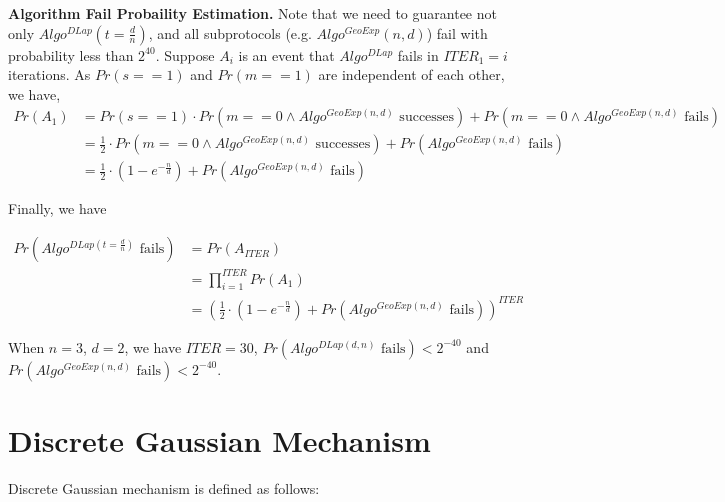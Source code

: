     \textbf{Algorithm Fail Probaility Estimation. }
    Note that we need to guarantee not only $Algo^{DLap}\left(t=\frac{d}{n}\right) $, and all subprotocols (e.g. $Algo^{GeoExp}\left(n,d\right)$) fail with probability less than $2^{40}$.
    Suppose $A_i$ is an event that $Algo^{DLap}$ fails in $ITER_1=i$ iterations.
    As $Pr\left(s==1\right)$ and  $Pr\left(m==1\right)$ are independent of each other, we have,
    \begin{equation}
        \begin{split}
            Pr\left(A_1\right) &=        Pr\left(s==1\right) \cdot Pr\left(m==0 \land Algo^{GeoExp\left(n,d\right) } \text{ successes}  \right)+Pr\left(m==0 \land Algo^{GeoExp\left(n,d\right) } \text{ fails}  \right)\\
            &=  \frac{1}{2}\cdot Pr\left(m==0 \land Algo^{GeoExp\left(n,d\right) } \text{ successes}  \right)+Pr\left( Algo^{GeoExp\left(n,d\right) } \text{ fails}  \right)\\
            &=\frac{1}{2}\cdot\left(1-e^{-\frac{n}{d}}\right) + Pr\left( Algo^{GeoExp\left(n,d\right) } \text{ fails} \right)
        \end{split}
    \end{equation}

    Finally, we have

    \begin{equation}
        \begin{split}
            Pr\left( Algo^{DLap\left(t=\frac{d}{n}\right) } \text{ fails} \right) &=  Pr\left(A_{ITER}\right) \\
            &=\prod _{i=1}^{ITER}Pr\left(A_1\right)\\
            &= \left(\frac{1}{2} \cdot \left(1-e^{-\frac{n}{d}}\right) + Pr\left( Algo^{GeoExp\left(n,d\right) } \text{ fails} \right)\right)^{ITER}
        \end{split}
    \end{equation}

    When $n=3$, $d=2$, we have $ITER=30$, $Pr\left( Algo^{DLap\left(d,n\right) } \text{ fails} \right) <2^{-40}$ and $Pr\left( Algo^{GeoExp\left(n,d\right) } \text{ fails} \right)  <2^{-40}$.

    \section{Discrete Gaussian Mechanism}
    \label{sec:DiscreteGaussianMechanism}
    Discrete Gaussian mechanism is defined as follows:

